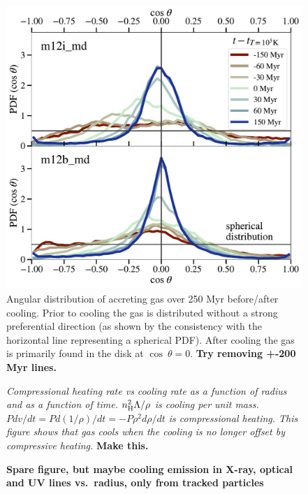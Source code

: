 \documentclass[fleqn,usenatbib]{mnras}
\begin{document}
\begin{figure}
    \centering
    \includegraphics[width=\columnwidth]{figures/theta_vs_t.pdf}
    \caption{
    Angular distribution of accreting gas over 250 Myr before/after cooling.
    Prior to cooling the gas is distributed without a strong preferential direction (as shown by the consistency with the horizontal line representing a spherical PDF).
    After cooling the gas is primarily found in the disk at $\cos\ \theta = 0$.
    \textbf{Try removing +-200 Myr lines.}
    }
    \label{f: theta vs R}
\end{figure}

\begin{figure}
\caption{
\textit{
Compressional heating rate vs cooling rate as a function of radius and as a function of time.
$n_{\rm H}^2 \Lambda / \rho$ is cooling per unit mass.
$P dv/dt = P d(1/\rho)/dt = -P \rho^2 d\rho/dt$ is compressional heating.
This figure shows that gas cools when the cooling is no longer offset by compressive heating.
}
\textbf{Make this.}
}
\end{figure}

\begin{figure}
    \centering
    \caption{
    \textbf{Spare figure, but maybe
    cooling emission in X-ray, optical and UV lines vs.\ radius, only from tracked particles
    }
    }
    \label{f:emission}
\end{figure}
\end{document}
